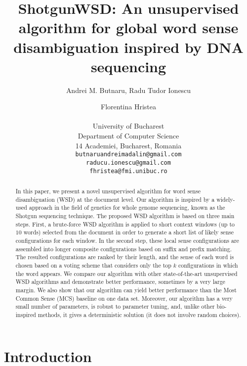 \documentclass[11pt]{article}
\title{ShotgunWSD: An unsupervised algorithm for global word sense disambiguation inspired by DNA sequencing}
\author{Andrei M. Butnaru, Radu Tudor Ionescu \and Florentina Hristea\\
  \\
  University of Bucharest\\
  Department of Computer Science\\
  14 Academiei, Bucharest, Romania\\
  {\tt butnaruandreimadalin@gmail.com}\\   
  {\tt raducu.ionescu@gmail.com}\\
  {\tt fhristea@fmi.unibuc.ro}  
}
\date{}
\begin{document}
\maketitle
\begin{abstract}
In this paper, we present a novel unsupervised algorithm for word sense disambiguation (WSD) at the document level. Our algorithm is inspired by a widely-used approach in the field of genetics for whole genome sequencing, known as the Shotgun sequencing technique. The proposed WSD algorithm is based on three main steps. First, a brute-force WSD algorithm is applied to short context windows (up to $10$ words) selected from the document in order to generate a short list of likely sense configurations for each window. In the second step, these local sense configurations are assembled into longer composite configurations based on suffix and prefix matching. The resulted configurations are ranked by their length, and the sense of each word is chosen based on a voting scheme that considers only the top $k$ configurations in which the word appears. We compare our algorithm with other state-of-the-art unsupervised WSD algorithms and demonstrate better performance, sometimes by a very large margin. We also show that our algorithm can yield better performance than the Most Common Sense (MCS) baseline on one data set. Moreover, our algorithm has a very small number of parameters, is robust to parameter tuning, and, unlike other bio-inspired methods, it gives a deterministic solution (it does not involve random choices). 
\end{abstract}

\section{Introduction}
\end{document}
